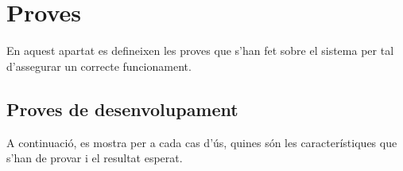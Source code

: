 
\chapter{Proves} %

\label{Proves} %

En aquest apartat es defineixen les proves que s'han fet sobre el sistema per tal d'assegurar un correcte funcionament.

\section{Proves de desenvolupament}

A continuació, es mostra per a cada cas d'ús, quines són les característiques que s'han de provar i el resultat esperat.

